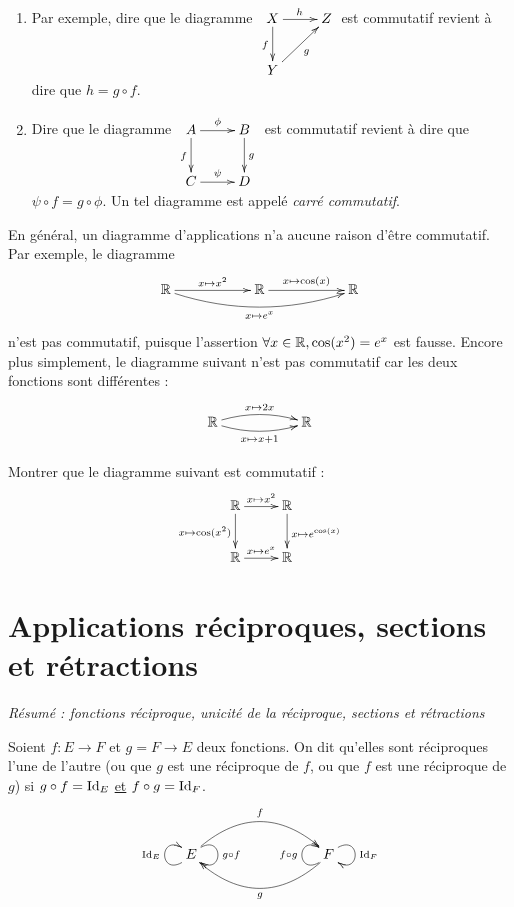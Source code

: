 \begin{exemple}
\begin{enumerate}
\item  Par exemple, dire que le diagramme
$
\xymatrix{
X \ar[d]_{f} \ar[r]^{h}& Z \\
Y \ar[ur]_{g}& 
}
$
est commutatif revient à dire que $h = g\circ f$.
\item Dire que le diagramme 
$\xymatrix{
A \ar[r]^{\phi} \ar[d]_{f} & B \ar[d]^{g}\\
C \ar[r]^{\psi}& D 
}$
est commutatif revient à dire que $\psi\circ f = g \circ \phi$. Un tel diagramme est appelé \emph{carré commutatif}.
\end{enumerate}
\end{exemple}

\begin{attention}
En général, un diagramme d'applications n'a aucune raison d'être commutatif.
Par exemple, le diagramme
\[\xymatrix{
\R \ar[rr]^{x\mapsto x^2} \ar@/_1pc/[rrrr]_{x\mapsto e^x}  & & \R \ar[rr]^{x\mapsto \cos(x)} & & \R
}\]
n'est pas commutatif, puisque l'assertion \og $\forall x\in \mathbb{R}, \cos(x^2)=e^{x}$\fg{} est fausse. Encore plus simplement, le diagramme suivant n'est pas commutatif car les deux fonctions sont différentes :
\[\xymatrix{
\R \ar@/^/[rr]^{x\mapsto 2x} \ar@/_/[rr]_{x\mapsto x+1} & & \R
}\]
\end{attention}

\begin{exercice} Montrer que le diagramme suivant est commutatif :
\[\xymatrix{
\R  \ar[r]^{x\mapsto x^2} \ar[d]_{x\mapsto \cos(x^2)} & \R  \ar[d]^{x\mapsto e^{\cos(x)}}\\
\R  \ar[r]^{x\mapsto e^x}& \R 
}\]
\end{exercice}




\section{Applications réciproques, sections et rétractions}

\emph{Résumé : fonctions réciproque, unicité de la réciproque, sections et rétractions}


\begin{definition}
Soient $f : E\to F$ et $g = F\to E$ deux fonctions. On dit qu'elles sont réciproques l'une de l'autre (ou que $g$ est une réciproque de $f$, ou que $f$ est une réciproque de $g$) si $g\circ f = \operatorname{Id}_E$ \underline{et} $f\circ g = \operatorname{Id}_F$. 
\[
\xymatrix{
 E \ar@(dl,ul)^{\Id_E} \ar@/^2pc/[rrr]^{f} \ar@(ur,dr)^{g\circ f} 
& & & 
\ar@/^2pc/[lll]^{g} \ar@(dl,ul)^{f\circ g} F \ar@(ur,dr)^{\Id_F}
}
\]
\end{definition}



